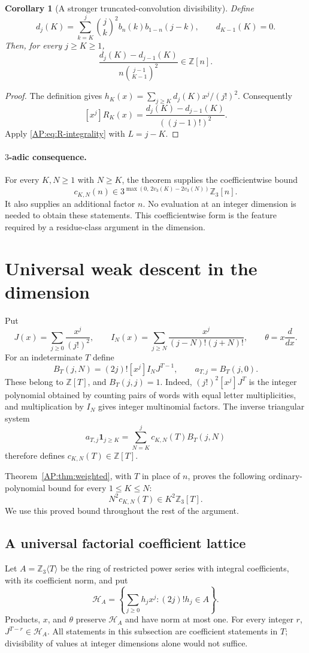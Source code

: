 \documentclass[11pt,a4paper]{article}
\newtheorem{corollary}[theorem]{Corollary}
\theoremstyle{definition}\newtheorem{definition}[theorem]{Definition}
\theoremstyle{remark}\newtheorem{remark}[theorem]{Remark}
\numberwithin{equation}{section}
\newcommand{\ZZ}{\mathbb Z}\newcommand{\QQ}{\mathbb Q}\newcommand{\tht}{\theta}
\begin{document}
\begin{corollary}[A stronger truncated-convolution divisibility]
Define
\[
 d_j(K)=\sum_{k=K}^{j}\binom{j}{k}^{\!2}
                   b_n(k)b_{1-n}(j-k),\qquad d_{K-1}(K)=0.
\]
Then, for every $j\geq K\geq1$,
\[
 \frac{d_j(K)-d_{j-1}(K)}{n\binom{j-1}{K-1}^{\!2}}\in\ZZ[n].
\]
\end{corollary}
\begin{proof}
The definition gives $h_K(x)=\sum_{j\geq K}d_j(K)x^j/(j!)^2$.
Consequently
\[
 [x^j]R_K(x)=\frac{d_j(K)-d_{j-1}(K)}{((j-1)!)^2}.
\]
Apply \eqref{AP:eq:R-integrality} with $L=j-K$.
\end{proof}

\paragraph{$3$-adic consequence.}
For every $K,N\geq1$ with $N\geq K$, the theorem supplies the
coefficientwise bound
\[
 c_{K,N}(n)\in
  3^{\max(0,\,2v_3(K)-2v_3(N))}\ZZ_3[n].
\]
It also supplies an additional factor $n$.  No evaluation at an integer
dimension is needed to obtain these statements.  This coefficientwise
form is the feature required by a residue-class argument in the dimension.

\section{Universal weak descent in the dimension}\label{AP:source-main-5}\label{AP:sec:universal}
Put
\[
 J(x)=\sum_{j\ge0}\frac{x^j}{(j!)^2},\qquad
 I_N(x)=\sum_{j\ge N}\frac{x^j}{(j-N)!(j+N)!},\qquad
 \theta=x\frac d{dx}.
\]
For an indeterminate $T$ define
\[
 B_T(j,N)=(2j)![x^j]I_NJ^{T-1},\qquad
 a_{T,j}=B_T(j,0).
\]
These belong to $\mathbb Z[T]$, and $B_T(j,j)=1$.
Indeed, $(j!)^2[x^j]J^T$ is the integer polynomial obtained by counting
pairs of words with equal letter multiplicities, and multiplication by
$I_N$ gives integer multinomial factors.  The inverse triangular system
\[
 a_{T,j}\mathbf1_{j\ge K}
   =\sum_{N=K}^j c_{K,N}(T)B_T(j,N)
\]
therefore defines $c_{K,N}(T)\in\mathbb Z[T]$.

Theorem~\ref{AP:thm:weighted}, with $T$ in place of $n$, proves
the following ordinary-polynomial bound for every $1\le K\le N$:
\[
                    N^2c_{K,N}(T)\in K^2\mathbb Z_3[T].
\tag{UW}
\]
We use this proved bound throughout the rest of the argument.

\subsection{A universal factorial coefficient lattice}
Let $A=\mathbb Z_3\langle T\rangle$ be the ring of restricted power
series with integral coefficients, with its coefficient norm, and put
\[
 \mathcal H_A=\left\{\sum_{j\ge0}h_jx^j:(2j)!h_j\in A\right\}.
\]
Products, $x$, and $\theta$ preserve $\mathcal H_A$ and have norm at
most one.  For every integer $r$, $J^{T-r}\in\mathcal H_A$.  All
statements in this subsection are coefficient statements in $T$;
divisibility of values at integer dimensions alone would not suffice.
\end{document}
